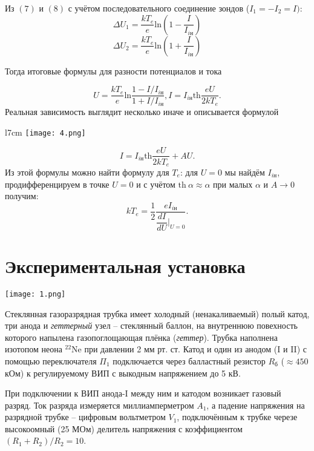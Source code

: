 Из $(7)$ и $(8)$ с учётом последовательного соединение зондов ($I_1 = -I_2 = I)$:
$$
	\Delta U_1= \dfrac{kT_e}{e}\text{ln}\left(1 - \dfrac{I}{I_{i\text{н}}}\right)
$$
$$
	\Delta U_2= \dfrac{kT_e}{e}\text{ln}\left(1 + \dfrac{I}{I_{i\text{н}}}\right)
$$

Тогда итоговые формулы для разности потенциалов и тока

\begin{equation}
	U = \dfrac{kT_e}{e}\text{ln}\dfrac{1 - I/I_{i\text{н}}}{1 + I/I_{i\text{н}}}, 
	I = I_{i\text{н}} \text{th}\dfrac{eU}{2kT_e}.
\end{equation}
Реальная зависимость выглядит несколько иначе и описывается формулой 
\begin{wrapfigure}{l}{7cm}
\texttt{[image: 4.png]}
\vspace{+30pt}
\end{wrapfigure}
\begin{equation}
	I = I_{i\text{н}} \text{th}\dfrac{eU}{2kT_e} + AU.
\end{equation}
Из этой формулы можно найти формулу для $T_e$: для $U=0$ мы найдём $I_{i\text{н}}$, продифференцируем в точке $U=0$ и с учётом $\text{th}~\alpha \approx \alpha$ при малых $\alpha$ и $A\rightarrow 0$ получим:
\begin{equation}
	kT_e = \dfrac{1}{2}\dfrac{eI_{i\text{н}}}{\dfrac{dI}{dU}|_{U=0}}.
\end{equation}

\section{Экспериментальная установка}


\begin{center}
	\texttt{[image: 1.png]}
\end{center}

Стеклянная газоразрядная трубка имеет холодный (ненакаливаемый) полый катод, три анода и \textit{геттерный} узел -- стеклянный баллон, на внутреннюю повехность которого напылена газопоглощающая плёнка (\textit{геттер}). Трубка наполнена изотопом неона $^22$Ne при давлении 2 мм рт. ст. Катод и один из анодом (I и II) с помощью переключателя $\Pi_1$ подключается через балластный резистор $R_\text{б}$ ($\approx 450$ кОм) к регулируемому ВИП с выкодным напряжением до 5 кВ.

При подключении к ВИП анода-I между ним и катодом возникает газовый разряд. Ток разряда измеряется миллиамперметром $A_1$, а падение напряжения на разрядной трубке -- цифровым вольтметром $V_1$, подключённым к трубке черезе высокоомный (25 МОм) делитель напряжения с коэффициентом $(R_1+R_2)/R_2 = 10$.

